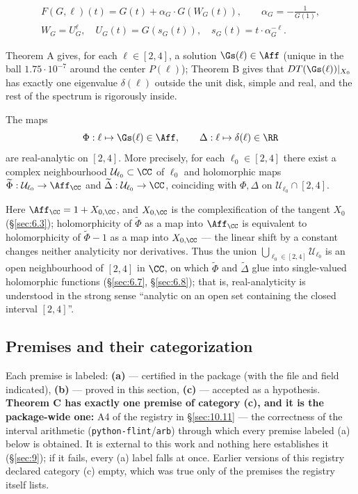 \begin{gather*}
F(G,\ell)(t)=G(t)+\alpha_G\cdot G(W_G(t)),
\qquad
\alpha_G=-\tfrac1{G(1)},\\
W_G=U_G^{\ell},\quad
U_G(t)=G(s_G(t)),\quad
s_G(t)=t\cdot\alpha_G^{-\ell}.
\end{gather*}

Theorem A gives, for each $\ell\in[2,4]$, a solution
$\Gs(\ell)\in\Aff$ (unique in the ball $1.75\cdot10^{-7}$ around
the center $P(\ell)$); Theorem B gives that $DT(\Gs(\ell))|_{X_0}$ has
exactly one eigenvalue $\delta(\ell)$ outside the unit disk, simple and real,
and the rest of the spectrum is rigorously inside.

\begin{theoremCrestated}[restated]
The maps
\[
\Phi:\ell\mapsto \Gs(\ell)\in\Aff,\qquad
\Delta:\ell\mapsto\delta(\ell)\in\RR
\]
are real-analytic on $[2,4]$. More precisely, for each
$\ell_0\in[2,4]$ there exist a complex neighbourhood
$\mathcal U_{\ell_0}\subset\CC$ of $\ell_0$ and holomorphic maps
$\widetilde\Phi:\mathcal U_{\ell_0}\to\Aff_{\CC}$ and
$\widetilde\Delta:\mathcal U_{\ell_0}\to\CC$, coinciding with
$\Phi,\Delta$ on $\mathcal U_{\ell_0}\cap[2,4]$.
\end{theoremCrestated}

Here $\Aff_{\CC}=1+X_{0,\CC}$, and $X_{0,\CC}$ is the
complexification of the tangent $X_0$ (\S\ref{sec:6.3}); holomorphicity of
$\widetilde\Phi$ as a map into $\Aff_{\CC}$ is equivalent to
holomorphicity of $\widetilde\Phi-1$ as a map into $X_{0,\CC}$ --- the
linear shift by a constant changes neither analyticity nor derivatives. Thus
the union $\bigcup_{\ell_0\in[2,4]}\mathcal U_{\ell_0}$ is an open
neighbourhood of $[2,4]$ in $\CC$, on which $\widetilde\Phi$ and
$\widetilde\Delta$ glue into single-valued holomorphic functions (\S\ref{sec:6.7},
\S\ref{sec:6.8}); that is, real-analyticity is understood in the strong sense ``analytic
on an open set containing the closed interval $[2,4]$''.


\subsection{Premises and their categorization}
\label{sec:6.2}

Each premise is labeled: \textbf{(a)} --- certified in the package (with the
file and field indicated), \textbf{(b)} --- proved in this section,
\textbf{(c)} --- accepted as a hypothesis. \textbf{Theorem C has exactly one
premise of category (c), and it is the package-wide one:} A4 of the registry
in \S\ref{sec:10.11} --- the correctness of the interval arithmetic
(\texttt{python-flint}/\texttt{arb}) through which every premise labeled (a)
below is obtained. It is external to this work and nothing here establishes
it (\S\ref{sec:9}); if it fails, every (a) label falls at once. Earlier
versions of this registry declared category (c) empty, which was true only of
the premises the registry itself lists.


